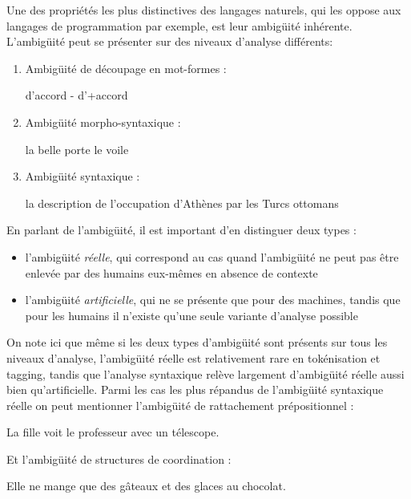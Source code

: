 \documentclass[12pt]{article}
\begin{document}
Une des propri\'et\'es les plus distinctives des langages naturels, qui les
oppose aux langages de programmation par exemple, est leur ambig\"uit\'e inh\'erente. L'ambig\"uit\'e peut se pr\'esenter sur des niveaux d'analyse diff\'erents:

\begin{enumerate}
\item Ambig\"uit\'e de d\'ecoupage en mot-formes :
\begin{exe}
\ex d'accord - d'+accord
\end{exe}
\item Ambig\"uit\'e morpho-syntaxique :
\begin{exe}
\ex la belle porte le voile
\end{exe}
\item Ambig\"uit\'e syntaxique :
\begin{exe}
\ex la description de l'occupation d'Ath\`enes par les Turcs ottomans
\end{exe}
\end{enumerate}


En parlant de l'ambig\"uit\'e, il est important d'en distinguer deux types :
\begin{itemize}
  \item l'ambig\"uit\'e \emph{r\'eelle}, qui correspond au cas quand l'ambig\"uit\'e
ne peut pas \^etre enlev\'ee par des humains eux-m\^emes en absence de contexte
\item l'ambig\"uit\'e \emph{artificielle}, qui ne se pr\'esente que pour des machines,
tandis que pour les humains il n'existe qu'une seule variante d'analyse possible
\end{itemize}

On note ici que m\^eme si les deux types d'ambig\"uit\'e sont pr\'esents sur tous les niveaux d'analyse, l'ambig\"uit\'e r\'eelle est relativement rare en tok\'enisation et tagging, tandis que l'analyse syntaxique
rel\`eve largement d'ambig\"uit\'e r\'eelle aussi bien qu'artificielle. Parmi les cas les plus r\'epandus de l'ambig\"uit\'e syntaxique r\'eelle on peut mentionner l'ambig\"uit\'e de rattachement pr\'epositionnel :

\begin{exe}
\ex La fille voit le professeur avec un t\'elescope.
\end{exe}

Et l'ambig\"uit\'e de structures de coordination :

\begin{exe}
\ex Elle ne mange que des g\^ateaux et des glaces au chocolat.
\end{exe}
\end{document}
